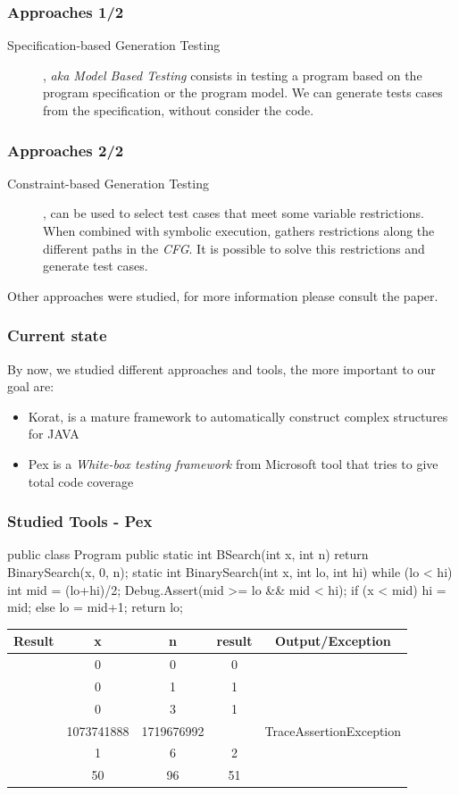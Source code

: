 \documentclass{beamer}
\newcommand{\checkK}{\color{green}\checkmark}
\newcommand{\cross}{\color{red}\hspace{-3pt}\ding{55}}
\begin{document}
\begin{frame}\frametitle{Approaches 1/2}
\begin{description}
\item[Specification-based Generation Testing], \textit{aka Model Based Testing} consists in testing a program based on the program specification or the program model.
We can generate tests cases from the specification, without consider the code.
\end{description}
\end{frame}

\begin{frame}\frametitle{Approaches 2/2}
\begin{description}
\item[Constraint-based Generation Testing], can be used to select test cases that meet some variable restrictions.
When combined with symbolic execution, gathers restrictions along the different paths in the \textit{CFG}.
It is possible to solve this restrictions and generate test cases.
\end{description}
Other approaches were studied, for more information please consult the paper.
\end{frame}

\begin{frame}\frametitle{Current state}
By now, we studied different approaches and tools, the more important to our goal are:
\begin{itemize}
\item Korat, is a mature framework to automatically construct complex structures for JAVA
\item Pex is a \textit{White-box testing framework} from Microsoft tool that tries to give total code coverage
\end{itemize}
\end{frame}

\begin{frame}[fragile] \frametitle{Studied Tools - Pex}
\begin{code}
public class Program {
  public static int BSearch(int x, int n) {
    return BinarySearch(x, 0, n);
  }
  static int BinarySearch(int x, int lo, int hi) {
    while (lo < hi) {
      int mid = (lo+hi)/2;
      Debug.Assert(mid >= lo && mid < hi);
      if (x < mid) { hi = mid; } else { lo = mid+1; }
    }
    return lo;
  }
}
\end{code}

{\tiny \begin{tabular}{|c|c|c|c|c|}\hline
Result & x & n & result & Output/Exception \\\hline
\checkK & 0 & 0 & 0      & \\\hline
\checkK & 0 & 1 & 1      & \\\hline
\checkK & 0 & 3 & 1      & \\\hline
\cross & 1073741888 & 1719676992 & & TraceAssertionException \\\hline
\checkK & 1 & 6 & 2      & \\\hline
\checkK & 50 & 96 & 51      &\\\hline
\end{tabular}
}
\end{frame}
\end{document}
